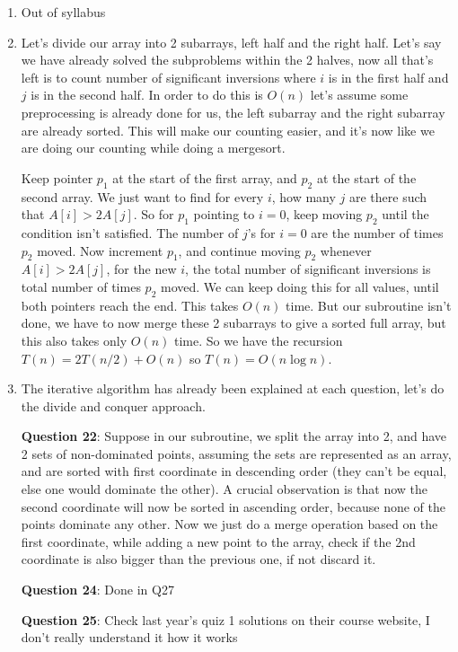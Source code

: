 \documentclass[12pt]{report}
\begin{document}
\begin{enumerate}[label=\textbf{\arabic*.}]
  \item Out of syllabus
  
  \item Let's divide our array into 2 subarrays, left half and the right half. Let's say we have already solved the subproblems within the 2
  halves, now all that's left is to count number of significant inversions where $i$ is in the first half and $j$ is in the second half. In order to 
  do this is $O(n)$ let's assume some preprocessing is already done for us, the left subarray and the right subarray are already sorted. This will
  make our counting easier, and it's now like we are doing our counting while doing a mergesort.
  
  Keep pointer $p_1$ at the start of the first array, and $p_2$ at the start of the second array. We just want to find for every $i$, how many $j$
  are there such that $A[i] > 2A[j]$. So for $p_1$ pointing to $i=0$, keep moving $p_2$ until the condition isn't satisfied. The number of $j$'s for 
  $i=0$ are the number of times $p_2$ moved. Now increment $p_1$, and continue moving $p_2$ whenever $A[i] > 2A[j]$, for the new $i$, the total number 
  of significant inversions is total number of times $p_2$ moved. We can keep doing this for all values, until both pointers reach the end. This takes 
  $O(n)$ time. But our subroutine isn't done, we have to now merge these 2 subarrays to give a sorted full array, but this also takes only $O(n)$ time.
  So we have the recursion $T(n) = 2T(n/2) + O(n)$ so $T(n) = O(n \log n)$.

  \item The iterative algorithm has already been explained at each question, let's do the divide and conquer approach.
  
  \textbf{Question 22}:
  Suppose in our subroutine, we split the array into 2, and have 2 sets of non-dominated points, assuming the sets are represented as an array, and 
  are sorted with first coordinate in descending order (they can't be equal, else one would dominate the other). A crucial observation is that now the second
  coordinate will now be sorted in ascending order, because none of the points dominate any other. Now we just do a merge operation based on the first 
  coordinate, while adding a new point to the array, check if the 2nd coordinate is also bigger than the previous one, if not discard it.

  \textbf{Question 24}:
  Done in Q27

  \textbf{Question 25}:
  Check last year's quiz 1 solutions on their course website, I don't really understand it how it works


\end{enumerate}
\end{document}
